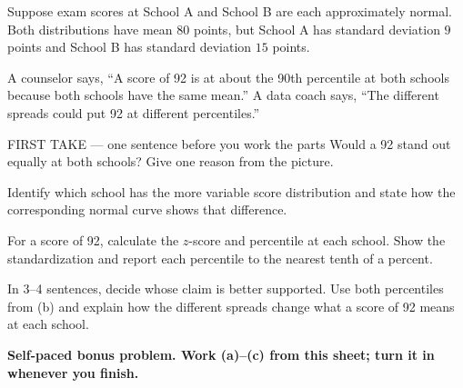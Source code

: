 \documentclass[14pt]{extarticle}
\begin{document}
\pagestyle{empty}


\noindent\begin{minipage}[t]{0.57\linewidth}
\vspace{0pt}
Suppose exam scores at School A and School B are each approximately normal. Both distributions have mean $80$ points, but School A has standard deviation $9$ points and School B has standard deviation $15$ points.\par\smallskip A counselor says, ``A score of 92 is at about the 90th percentile at both schools because both schools have the same mean.'' A data coach says, ``The different spreads could put 92 at different percentiles.''\par
\end{minipage}\hfill
\begin{minipage}[t]{0.40\linewidth}
\vspace{0pt}
\begin{center}
\end{center}
\end{minipage}

\begin{firsttakebox}{FIRST TAKE --- one sentence before you work the parts}
Would a 92 stand out equally at both schools? Give one reason from the picture.
\end{firsttakebox}

\begin{description}[leftmargin=1.15in, labelwidth=1in, itemsep=2pt, topsep=2pt]
  \item[\dokbadge{1}~(a)] Identify which school has the more variable score distribution and state how the corresponding normal curve shows that difference.
  \item[\dokbadge{2}~(b)] For a score of 92, calculate the $z$-score and percentile at each school. Show the standardization and report each percentile to the nearest tenth of a percent.
  \item[\dokbadge{3}~(c)] In 3--4 sentences, decide whose claim is better supported. Use both percentiles from (b) and explain how the different spreads change what a score of 92 means at each school.
\end{description}

\vfill
\textbf{Self-paced bonus problem. Work (a)--(c) from this sheet; turn it in whenever you finish.}
\end{document}

